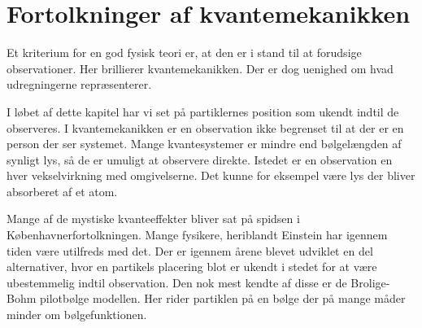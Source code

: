 \documentclass[../Kvantemekanik.tex]{subfiles}
\begin{document}
\section{Fortolkninger af kvantemekanikken}

Et kriterium for en god fysisk teori er, at den er i stand til at forudsige observationer. Her brillierer kvantemekanikken. Der er dog uenighed om hvad udregningerne repræsenterer.

I løbet af dette kapitel har vi set på partiklernes position som ukendt indtil de observeres. I kvantemekanikken er en observation ikke begrenset til at der er en person der ser systemet. Mange kvantesystemer er mindre end bølgelængden af synligt lys, så de er umuligt at observere direkte. Istedet er en observation en hver vekselvirkning med omgivelserne. Det kunne for eksempel være lys der bliver absorberet af et atom.

Mange af de mystiske kvanteeffekter bliver sat på spidsen i Københavnerfortolkningen. Mange fysikere, heriblandt Einstein har igennem tiden være utilfreds med det. Der er igennem årene blevet udviklet en del alternativer, hvor en partikels placering blot er ukendt i stedet for at være ubestemmelig indtil observation.
Den nok mest kendte af disse er de Brolige-Bohm pilotbølge modellen. Her rider partiklen på en bølge der på mange måder minder om bølgefunktionen.
\end{document}
